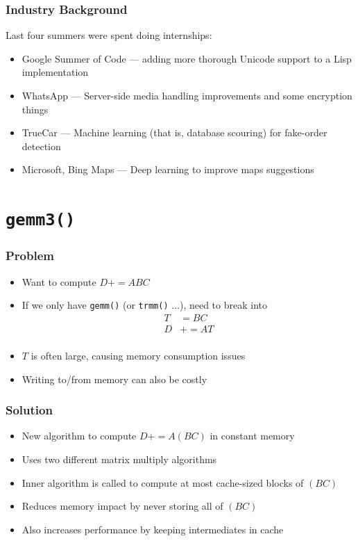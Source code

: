 \documentclass{beamer}
\begin{document}
\begin{frame}
  \frametitle{Industry Background}
  Last four summers were spent doing internships:
  \begin{itemize}
  \item Google Summer of Code ---  adding more thorough Unicode support to a Lisp implementation
  \item WhatsApp --- Server-side media handling improvements and some encryption things
  \item TrueCar --- Machine learning (that is, database scouring) for fake-order detection
  \item Microsoft, Bing Maps --- Deep learning to improve maps suggestions
  \end{itemize}
\end{frame}

\section{\texttt{gemm3()}}
\begin{frame}
  \frametitle{Problem}
  \begin{itemize}
  \item Want to compute $D += ABC$
  \item If we only have \texttt{gemm()} (or \texttt{trmm()} $\ldots$), need to break into
    \begin{align*}
      T &= BC\\
      D &+= AT\\
    \end{align*}
  \item $T$ is often large, causing memory consumption issues
  \item Writing to/from memory can also be costly
  \end{itemize}
\end{frame}

\begin{frame}
  \frametitle{Solution}
  \begin{itemize}
  \item New algorithm to compute $D += A(BC)$ in constant memory
  \item Uses two different matrix multiply algorithms
  \item Inner algorithm is called to compute at most cache-sized blocks of $(BC)$
  \item Reduces memory impact by never storing all of $(BC)$
  \item Also increases performance by keeping intermediates in cache
  \end{itemize}
\end{frame}
\end{document}
